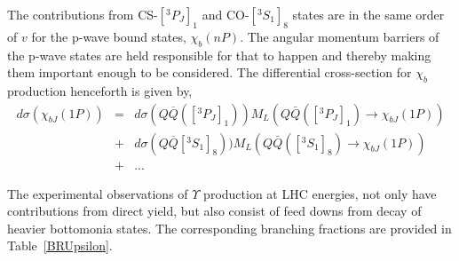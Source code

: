 The contributions from CS-$[^3P_J]_1$ and CO-$[^3S_1]_8$ states are in the same order
of $v$ for the p-wave bound states, $\chi_{b}(nP)$. The angular momentum barriers of the p-wave
states are held responsible for that to happen and thereby making them important enough
to be considered. The differential cross-section for $\chi_b$ production
henceforth is given by,
\begin{eqnarray}
  d\sigma(\chi_{bJ}(1P)) &=& d\sigma(Q\overline{Q}([^3P_J]_{1}))
  M_{L}(Q\bar{Q}([^3P_J]_{1})\rightarrow \chi_{bJ}(1P)) \nonumber \\
  &+& d\sigma(Q\overline{Q}[^3S_1]_{8}))
  M_{L}(Q\bar{Q}([^3S_1]_{8})\rightarrow \chi_{bJ}(1P))  \nonumber \\
  &+& ...
  \label{eq9}
\end{eqnarray}

The experimental observations of $\Upsilon$ production at LHC energies, not only have contributions from
direct yield, but also consist of feed downs from decay of heavier bottomonia states.
The corresponding branching fractions are
provided in Table~\ref{BRUpsilon}.



